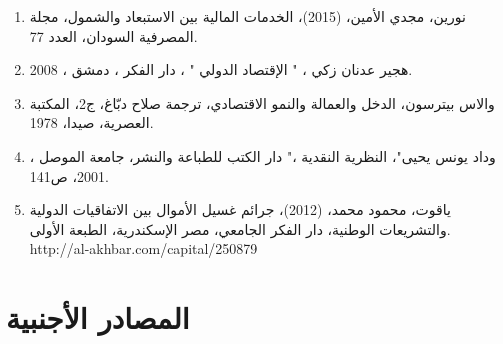 \documentclass[10pt,a4paper]{report}
\begin{document}
\begin{enumerate}
	\item نورين، مجدي الأمين، (2015)، الخدمات المالية بين الاستبعاد والشمول، مجلة المصرفية السودان، العدد 77.
	\item هجير عدنان زكي ، " الإقتصاد الدولي " ، دار الفكر ، دمشق ، 2008.
	\item والاس بيترسون، الدخل والعمالة والنمو الاقتصادي، ترجمة صلاح دبّاغ، ج2، المكتبة العصرية، صيدا، 1978.
	\item وداد يونس يحيى"، النظرية النقدية ،" دار الكتب للطباعة والنشر، جامعة الموصل ، 2001، ص141.
	\item ياقوت، محمود محمد، (2012)، جرائم غسيل الأموال بين الاتفاقيات الدولية والتشريعات الوطنية، دار الفكر الجامعي، مصر الإسكندرية، الطبعة الأولى. 
	{http://al-akhbar.com/capital/250879}
\end{enumerate}
\section*{المصادر الأجنبية}
\end{document}
